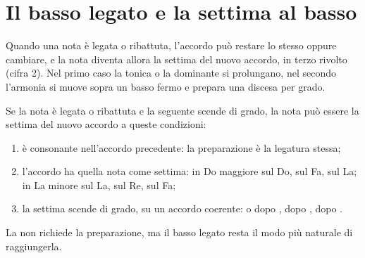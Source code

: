 \section{Il basso legato e la settima al basso}
\label{sec:basso_legato}

Quando una nota è legata o ribattuta, l'accordo può restare lo stesso oppure cambiare, e la nota diventa allora la settima del nuovo accordo, in terzo rivolto (cifra 2). Nel primo caso la tonica o la dominante si prolungano, nel secondo l'armonia si muove sopra un basso fermo e prepara una discesa per grado.

\begin{regola}
	\label{reg:settima_basso}
	Se la nota è legata o ribattuta e la seguente scende di grado, la nota può essere la settima del nuovo accordo a queste condizioni:
	\begin{enumerate}
		\item è consonante nell'accordo precedente: la preparazione è la legatura stessa;
		\item l'accordo ha quella nota come settima: in Do maggiore  sul Do,  sul Fa,  sul La; in La minore  sul La,  sul Re,  sul Fa;
		\item la settima scende di grado, su un accordo coerente:  o  dopo ,  dopo ,  dopo .
	\end{enumerate}
	La  non richiede la preparazione, ma il basso legato resta il modo più naturale di raggiungerla.
\end{regola}

